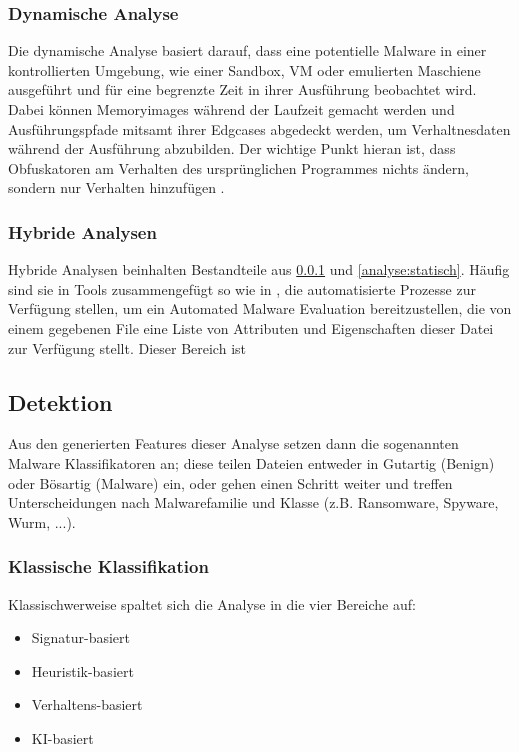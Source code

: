 \subsubsection{Dynamische Analyse}
\label{analyse:dynamisch}
Die dynamische Analyse basiert darauf, dass eine potentielle Malware in einer kontrollierten Umgebung, wie einer Sandbox, VM oder emulierten Maschiene ausgeführt und für eine begrenzte Zeit in ihrer Ausführung beobachtet wird\cite{aboaoja_2023_a}. Dabei können Memoryimages während der Laufzeit gemacht werden und Ausführungspfade mitsamt ihrer Edgcases abgedeckt werden, um Verhaltnesdaten während der Ausführung abzubilden. Der wichtige Punkt hieran ist, dass Obfuskatoren am Verhalten des ursprünglichen Programmes nichts ändern, sondern nur Verhalten hinzufügen \cite{alkhateeb_2023_a}. 

\subsubsection{Hybride Analysen}
\label{analyse:hybrid}
Hybride Analysen beinhalten Bestandteile aus \ref{analyse:dynamisch} und \ref{analyse:statisch}. Häufig sind sie in Tools zusammengefügt so wie in \cite{CAPE2}, die automatisierte Prozesse zur Verfügung stellen, um ein Automated Malware Evaluation bereitzustellen, die von einem gegebenen File eine Liste von Attributen und Eigenschaften dieser Datei zur Verfügung stellt. Dieser Bereich ist 

\subsection{Detektion}
Aus den generierten Features dieser Analyse setzen dann die sogenannten Malware Klassifikatoren an; diese teilen Dateien entweder in Gutartig (Benign) oder Bösartig (Malware) ein, oder gehen einen Schritt weiter und treffen Unterscheidungen nach Malwarefamilie und Klasse (z.B. Ransomware, Spyware, Wurm, ...).

\subsubsection{Klassische Klassifikation}
Klassischwerweise spaltet sich die Analyse in die vier Bereiche auf: 
\begin{itemize}
    \item Signatur-basiert
    \item Heuristik-basiert
    \item Verhaltens-basiert
    \item KI-basiert
\end{itemize}

